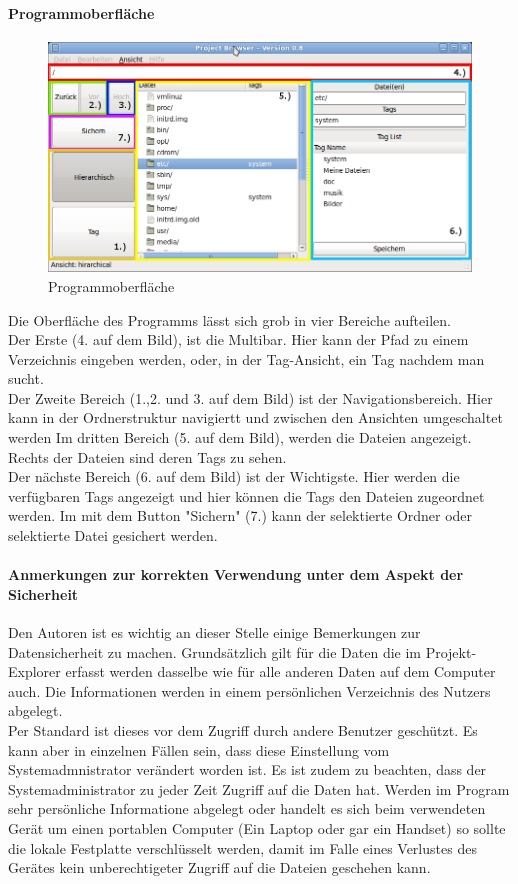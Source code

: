 \documentclass[10pt,paper=a4,final]{scrartcl}
\begin{document}
\paragraph{Programmoberfl\"ache}
\begin{figure}[h!]
\includegraphics[scale=0.5]{erlaeuterungen_gui.png}
\caption{Programmoberfl\"ache}
\end{figure}
Die Oberfl\"ache des Programms l\"asst sich grob in vier Bereiche aufteilen.\\
Der Erste (4. auf dem Bild), ist die Multibar. Hier kann der Pfad zu einem Verzeichnis eingeben werden, oder, in der Tag-Ansicht, ein Tag nachdem man sucht.\\
Der Zweite Bereich (1.,2. und 3. auf dem Bild) ist der Navigationsbereich. Hier kann in der Ordnerstruktur navigiertt und zwischen den Ansichten umgeschaltet werden Im dritten Bereich (5. auf dem Bild), werden die Dateien angezeigt. Rechts der Dateien sind deren Tags zu sehen.\\
Der nächste Bereich (6. auf dem Bild) ist der Wichtigste. Hier werden die verf\"ugbaren Tags angezeigt und hier k\"onnen die Tags den Dateien zugeordnet werden. Im mit dem Button "Sichern" (7.) kann der selektierte Ordner oder selektierte Datei gesichert werden.\\
\paragraph{Anmerkungen zur korrekten Verwendung unter dem Aspekt der Sicherheit}
Den Autoren ist es wichtig an dieser Stelle einige Bemerkungen zur Datensicherheit zu machen.
Grunds\"atzlich gilt f\"ur die Daten die im Projekt-Explorer erfasst werden dasselbe wie f\"ur alle anderen Daten auf dem Computer auch. Die Informationen werden in einem pers\"onlichen Verzeichnis des Nutzers abgelegt.\\
Per Standard ist dieses vor dem Zugriff durch andere Benutzer gesch\"utzt. Es kann aber in einzelnen F\"allen sein, dass diese Einstellung vom Systemadmnistrator ver\"andert worden ist.
Es ist zudem zu beachten, dass der Systemadministrator zu jeder Zeit Zugriff auf die Daten hat.
Werden im Program sehr pers\"onliche Informatione abgelegt oder handelt es sich beim verwendeten Ger\"at um einen portablen Computer (Ein Laptop oder gar ein Handset) so sollte die lokale Festplatte verschl\"usselt werden, damit im Falle eines Verlustes des Ger\"ates kein unberechtigeter Zugriff auf die Dateien geschehen kann.
\end{document}
